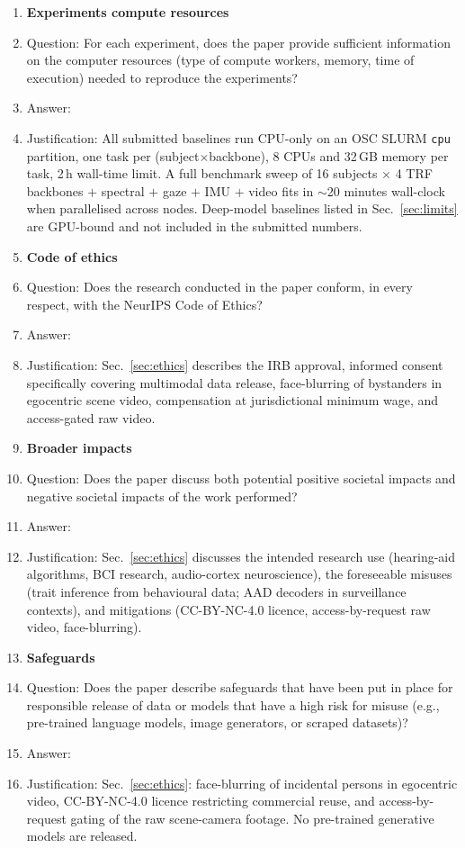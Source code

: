 \begin{enumerate}
\item {\bf Experiments compute resources}
    \item[] Question: For each experiment, does the paper provide sufficient information on the computer resources (type of compute workers, memory, time of execution) needed to reproduce the experiments?
    \item[] Answer: \answerYes{}
    \item[] Justification: All submitted baselines run CPU-only on an OSC SLURM \texttt{cpu} partition, one task per (subject$\times$backbone), 8 CPUs and 32\,GB memory per task, 2\,h wall-time limit. A full benchmark sweep of 16 subjects $\times$ 4 TRF backbones $+$ spectral $+$ gaze $+$ IMU $+$ video fits in $\sim$20 minutes wall-clock when parallelised across nodes. Deep-model baselines listed in Sec.~\ref{sec:limits} are GPU-bound and not included in the submitted numbers.

\item {\bf Code of ethics}
    \item[] Question: Does the research conducted in the paper conform, in every respect, with the NeurIPS Code of Ethics?
    \item[] Answer: \answerYes{}
    \item[] Justification: Sec.~\ref{sec:ethics} describes the IRB approval, informed consent specifically covering multimodal data release, face-blurring of bystanders in egocentric scene video, compensation at jurisdictional minimum wage, and access-gated raw video.

\item {\bf Broader impacts}
    \item[] Question: Does the paper discuss both potential positive societal impacts and negative societal impacts of the work performed?
    \item[] Answer: \answerYes{}
    \item[] Justification: Sec.~\ref{sec:ethics} discusses the intended research use (hearing-aid algorithms, BCI research, audio-cortex neuroscience), the foreseeable misuses (trait inference from behavioural data; AAD decoders in surveillance contexts), and mitigations (CC-BY-NC-4.0 licence, access-by-request raw video, face-blurring).

\item {\bf Safeguards}
    \item[] Question: Does the paper describe safeguards that have been put in place for responsible release of data or models that have a high risk for misuse (e.g., pre-trained language models, image generators, or scraped datasets)?
    \item[] Answer: \answerYes{}
    \item[] Justification: Sec.~\ref{sec:ethics}: face-blurring of incidental persons in egocentric video, CC-BY-NC-4.0 licence restricting commercial reuse, and access-by-request gating of the raw scene-camera footage. No pre-trained generative models are released.


\end{enumerate}
